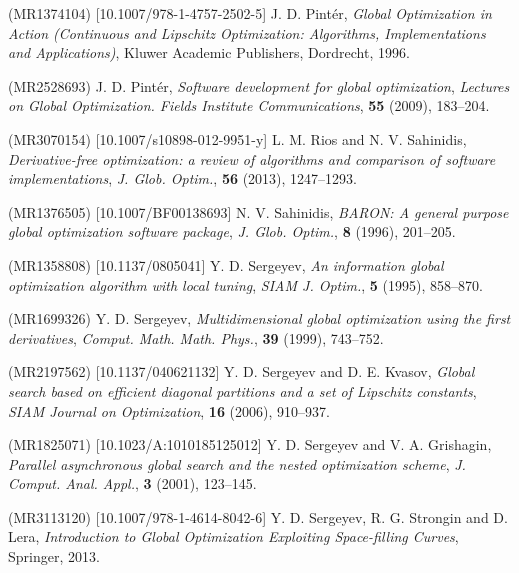 \documentclass{naco}
\theoremstyle{definition}
\begin{document}
\begin{thebibliography}{99}
 (MR1374104) [10.1007/978-1-4757-2502-5]
\newblock J. D. Pint\'er,
\newblock \emph{Global Optimization in Action (Continuous and Lipschitz Optimization: Algorithms, Implementations and Applications)},
\newblock Kluwer Academic Publishers, Dordrecht, 1996.

 (MR2528693)
\newblock J. D. Pint\'er,
\newblock \emph{\emph{Software development for global optimization}},
\newblock \emph{Lectures on Global Optimization. Fields Institute Communications}, \textbf{55} (2009), 183--204.

 (MR3070154) [10.1007/s10898-012-9951-y]
\newblock L. M. Rios and N. V. Sahinidis,
\newblock \emph{\emph{Derivative-free optimization: a review of algorithms and comparison of software implementations}},
\newblock \emph{J. Glob. Optim.}, \textbf{56} (2013), 1247--1293.

 (MR1376505) [10.1007/BF00138693]
\newblock N. V. Sahinidis,
\newblock \emph{\emph{BARON: A general purpose global optimization software package}},
\newblock \emph{J. Glob. Optim.}, \textbf{8} (1996), 201--205.

 (MR1358808) [10.1137/0805041]
\newblock Y. D. Sergeyev,
\newblock \emph{\emph{An information global optimization algorithm with local tuning}},
\newblock \emph{SIAM J. Optim.}, \textbf{5} (1995), 858--870.

 (MR1699326)
\newblock Y. D. Sergeyev,
\newblock \emph{\emph{Multidimensional global optimization using the first derivatives}},
\newblock \emph{Comput. Math. Math. Phys.}, \textbf{39} (1999), 743--752.

 (MR2197562) [10.1137/040621132]
\newblock Y. D. Sergeyev and D. E. Kvasov,
\newblock \emph{\emph{Global search based on efficient diagonal partitions and a set of Lipschitz constants}},
\newblock \emph{SIAM Journal on Optimization}, \textbf{16} (2006), 910--937.

 (MR1825071) [10.1023/A:1010185125012]
\newblock Y. D. Sergeyev and V. A. Grishagin,
\newblock \emph{\emph{Parallel asynchronous global search and the nested optimization scheme}},
\newblock \emph{J. Comput. Anal. Appl.}, \textbf{3} (2001), 123--145.

 (MR3113120) [10.1007/978-1-4614-8042-6]
\newblock Y. D. Sergeyev, R. G. Strongin and D. Lera,
\newblock \emph{Introduction to Global Optimization Exploiting Space-filling Curves},
\newblock Springer, 2013.


\end{thebibliography}
\end{document}
